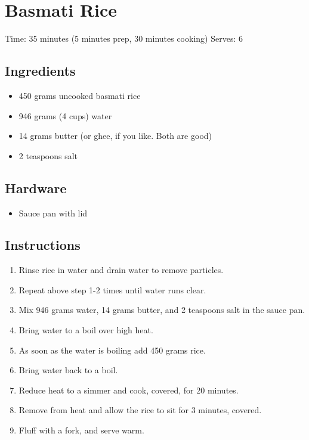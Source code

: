\section{Basmati Rice}
\label{basmatiRice}
\setcounter{secnumdepth}{0}
Time: 35 minutes (5 minutes prep, 30 minutes cooking)
Serves: 6

\begin{multicols}{2}
\subsection*{Ingredients}
\begin{itemize}
    \item 450 grams uncooked basmati rice
    \item 946 grams (4 cups) water
    \item 14 grams butter (or ghee, if you like. Both are good)
    \item 2 teaspoons salt
\end{itemize}

\subsection*{Hardware}
\begin{itemize}
    \item Sauce pan with lid
\end{itemize}
\clearpage

\subsection*{Instructions}
\begin{enumerate}
    \item Rinse rice in water and drain water to remove particles.
    \item Repeat above step 1-2 times until water runs clear.
    \item Mix 946 grams water, 14 grams butter, and 2 teaspoons salt in the sauce pan.
    \item Bring water to a boil over high heat.
    \item As soon as the water is boiling add 450 grams rice.
    \item Bring water back to a boil.
    \item Reduce heat to a simmer and cook, covered, for 20 minutes.
    \item Remove from heat and allow the rice to sit for 3 minutes, covered.
    \item Fluff with a fork, and serve warm.


\end{enumerate}
\end{multicols}
